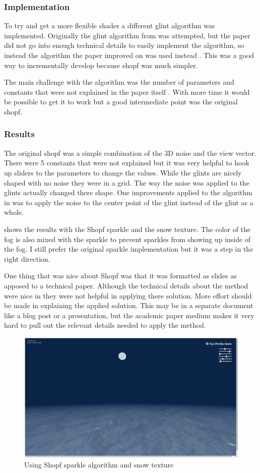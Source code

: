 \documentclass{IEEEtran}
\begin{document}
\subsubsection{Implementation}

To try and get a more flexible shader a different glint algorithm was implemented. Originally
the glint algorithm from \cite{sparkle} was attempted, but the paper did not go into
enough technical details to easily implement the algorithm, so instead the algorithm
the paper improved on was used instead \cite{shopf}. This was a good way to incrementally
develop because shopf was much simpler.

The main challenge with the algorithm was the number of parameters and constants
that were not explained in the paper itself \cite{sparkle}. With more time it would
be possible to get it to work but a good intermediate point was the original shopf.

\subsubsection{Results}

The original shopf was a simple combination of the 3D noise and the view vector. There
were 5 constants that were not explained but it was very helpful to hook up sliders to
the parameters to change the values. While the glints are nicely shaped with no noise
they were in a grid. The way the noise was applied to the glints actually changed there
shape. One improvements applied to the algorithm in \cite{sparkle} was to apply the noise
to the center point of the glint instead of the glint as a whole.

 shows the results with the Shopf sparkle and the snow texture.
The color of the fog is also mixed with the sparkle to prevent sparkles from showing up
inside of the fog. I still prefer the original sparkle implementation but it was a step
in the right direction.

One thing that was nice about Shopf was that it was formatted as slides as apposed to a
technical paper. Although the technical details about the method were nice in \cite{sparkle}
they were not helpful in applying there solution. More effort should be made in explaining the
applied solution. This may be in a separate document like a blog post or a presentation,
but the academic paper medium makes it very hard to pull out the relevant details needed
to apply the method.

\begin{figure}
    \includegraphics[width=\linewidth]{images/results.png}
    \caption{Using Shopf sparkle algorithm and snow texture}
    \label{fig:shopf-sparkle}
\end{figure}




\end{document}
